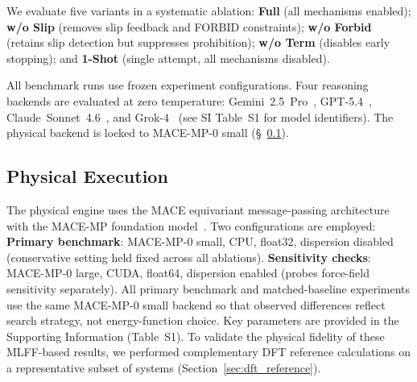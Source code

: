 We evaluate five variants in a systematic ablation: \textbf{Full} (all mechanisms enabled); \textbf{w/o Slip} (removes slip feedback and FORBID constraints); \textbf{w/o Forbid} (retains slip detection but suppresses prohibition); \textbf{w/o Term} (disables early stopping); and \textbf{1-Shot} (single attempt, all mechanisms disabled).

All benchmark runs use frozen experiment configurations. Four reasoning backends are evaluated at zero temperature: Gemini~2.5~Pro~\cite{gemini2026modelcard}, GPT-5.4~\cite{openai2026gpt5}, Claude~Sonnet~4.6~\cite{anthropic2026claude}, and Grok-4~\cite{grok2025blog} (see SI Table~S1 for model identifiers).
The physical backend is locked to MACE-MP-0 small (\S~\ref{sec:mace_config}).

\subsection{Physical Execution}
\label{sec:mace_config}

The physical engine uses the MACE equivariant message-passing architecture with the MACE-MP foundation model~\cite{batatia2022mace,batatia2023foundation}.
Two configurations are employed:
\textbf{Primary benchmark}: MACE-MP-0 small, CPU, float32, dispersion disabled (conservative setting held fixed across all ablations).
\textbf{Sensitivity checks}: MACE-MP-0 large, CUDA, float64, dispersion enabled (probes force-field sensitivity separately).
All primary benchmark and matched-baseline experiments use the same MACE-MP-0 small backend so that observed differences reflect search strategy, not energy-function choice. Key parameters are provided in the Supporting Information (Table~S1). To validate the physical fidelity of these MLFF-based results, we performed complementary DFT reference calculations on a representative subset of systems (Section~\ref{sec:dft_reference}).

\label{sec:dft_reference}

